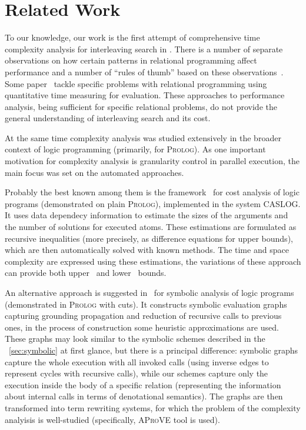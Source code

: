 \section{Related Work}
\label{sec:related}

To our knowledge, our work is the first attempt of comprehensive time complexity analysis for interleaving search in \mK.
There is a number of separate observations on how certain patterns in relational programming affect performance and a number
of ``rules of thumb'' based on these observations~\cite{WillsThesis}. Some paper~\cite{GuardedFresh, FloatArithmetics, UniversalQuantification} tackle
specific problems with relational programming using quantitative time measuring for evaluation. These approaches to performance analysis, being sufficient
for specific relational problems, do not provide the general understanding of interleaving search and its cost.

At the same time complexity analysis was studied extensively in the broader context of logic programming (primarily, for \textsc{Prolog}).
As one important motivation for complexity analysis is granularity control in parallel execution, the main focus was set on the automated approaches.

Probably the best known among them is the framework~\cite{CostAnalysisLP} for cost analysis of logic programs (demonstrated on plain \textsc{Prolog}),
implemented in the system \textsc{CASLOG}. It uses data dependecy information to estimate the sizes of the arguments and the number of solutions for
executed atoms. These estimations are formulated as recursive inequalities (more precisely, as difference equations for upper bounds), which are then
automatically solved with known methods. The time and space complexity are expressed using these estimations, the variations of these approach can
provide both upper~\cite{CostAnalysisLP} and lower~\cite{CostAnalysisLPLower} bounds.

An alternative approach is suggested in~\cite{SymbolicAnalysisLP} for symbolic analysis of logic programs (demonstrated in \textsc{Prolog} with cuts).
It constructs symbolic evaluation graphs capturing grounding propagation and reduction of recursive calls to previous ones, in the process of construction
some heuristic approximations are used. These graphs may look similar to the symbolic schemes described in the \sectionword~\ref{sec:symbolic} at first glance,
but there is a principal difference: symbolic graphs capture the whole execution with all invoked calls (using inverse edges to represent cycles with recursive calls),
while our schemes capture only the execution inside the body of a specific relation (representing the information about internal calls in terms of denotational semantics).
The graphs are then transformed into term rewriting systems, for which the problem of the complexity analyisis is well-studied (specifically, \textsc{AProVE} tool is used).

